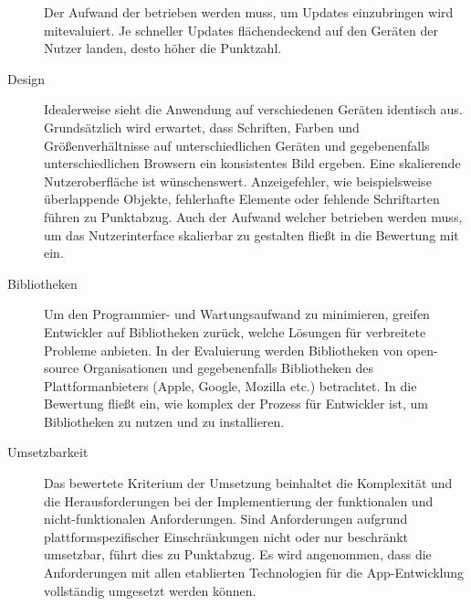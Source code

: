 \begin{description}
	      Der Aufwand der betrieben werden muss, um Updates einzubringen wird mitevaluiert. Je schneller Updates flächendeckend auf den Geräten der Nutzer landen, desto höher die Punktzahl.

	\item [Design]
	      Idealerweise sieht die Anwendung auf verschiedenen Geräten identisch aus. Grundsätzlich wird erwartet, dass Schriften, Farben und Größenverhältnisse auf unterschiedlichen Geräten und gegebenenfalls unterschiedlichen Browsern ein konsistentes Bild ergeben.
	      Eine skalierende Nutzeroberfläche ist wünschenswert. Anzeigefehler, wie beispielsweise überlappende Objekte, fehlerhafte Elemente oder fehlende Schriftarten führen zu Punktabzug. Auch der Aufwand welcher betrieben werden muss, um das Nutzerinterface skalierbar zu gestalten fließt in die Bewertung mit ein.

	      

	\item[Bibliotheken]
		Um den Programmier- und Wartungsaufwand zu minimieren, greifen Entwickler auf Bibliotheken zurück, welche Lösungen für verbreitete Probleme anbieten.
		 In der Evaluierung werden Bibliotheken von open-source Organisationen und gegebenenfalls Bibliotheken des Plattformanbieters (Apple, Google, Mozilla etc.) betrachtet. In die Bewertung fließt ein, wie komplex der Prozess für Entwickler ist, um Bibliotheken zu nutzen und zu installieren. 

	\item[Umsetzbarkeit]
		Das bewertete Kriterium der Umsetzung beinhaltet die Komplexität und die Herausforderungen bei der Implementierung der funktionalen und nicht-funktionalen Anforderungen. Sind Anforderungen aufgrund plattformspezifischer Einschränkungen nicht oder nur beschränkt umsetzbar, führt dies zu Punktabzug. Es wird angenommen, dass die Anforderungen mit allen etablierten Technologien für die App-Entwicklung vollständig umgesetzt werden können.
		

\end{description}
